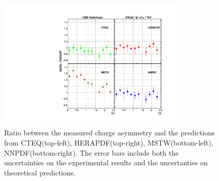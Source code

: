 \begin{figure}[htbp]
  \begin{center}
\includegraphics*[width=0.80\textwidth]{plotCarino}
  \caption{\label{fig:resFitRatio} Ratio between the measured charge asymmetry and the predictions from CTEQ(top-left), HERAPDF(top-right), MSTW(bottom-left), NNPDF(bottom-right). The error bars include both the uncertainties on the experimental results and the uncertanties on theoretical predictions.}
  \end{center}
\end{figure}

